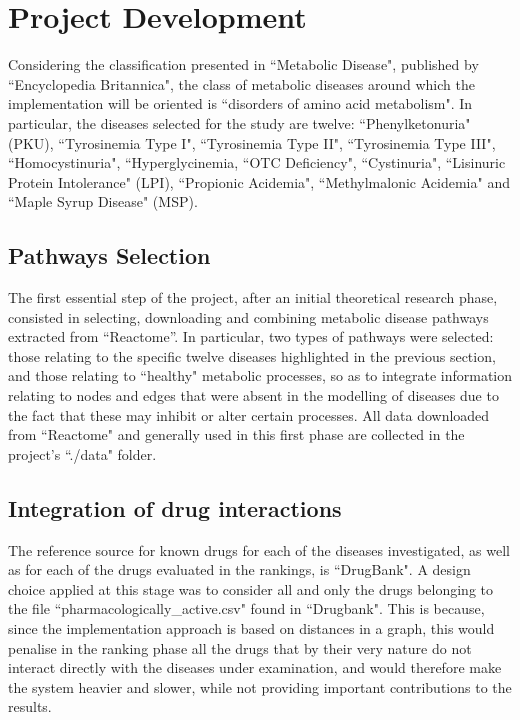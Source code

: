 \chapter{Project Development}\label{chap:project}

Considering the classification presented in ``Metabolic Disease", published by ``Encyclopedia Britannica"\cite{britannica}, the class of metabolic diseases around which the implementation will be oriented is ``disorders of amino acid metabolism". In particular, the diseases selected for the study are twelve: ``Phenylketonuria" (PKU), ``Tyrosinemia Type I", ``Tyrosinemia Type II", ``Tyrosinemia Type III", ``Homocystinuria", ``Hyperglycinemia, ``OTC Deficiency", ``Cystinuria", ``Lisinuric Protein Intolerance" (LPI), ``Propionic Acidemia", ``Methylmalonic Acidemia" and ``Maple Syrup Disease" (MSP).

\section{Pathways Selection}

The first essential step of the project, after an initial theoretical research phase, consisted in selecting, downloading and combining metabolic disease pathways extracted from ``Reactome''\cite{reactome}. In particular, two types of pathways were selected: those relating to the specific twelve diseases highlighted in the previous section, and those relating to ``healthy" metabolic processes, so as to integrate information relating to nodes and edges that were absent in the modelling of diseases due to the fact that these may inhibit or alter certain processes. All data downloaded from ``Reactome"\cite{reactome} and generally used in this first phase are collected in the project's ``./data" folder.

\section{Integration of drug interactions}
The reference source for known drugs for each of the diseases investigated, as well as for each of the drugs evaluated in the rankings, is ``DrugBank"\cite{drugbank}.
A design choice applied at this stage was to consider all and only the drugs belonging to the file ``pharmacologically\_active.csv" found in ``Drugbank"\cite{drugbank}. This is because, since the implementation approach is based on distances in a graph, this would penalise in the ranking phase all the drugs that by their very nature do not interact directly with the diseases under examination, and would therefore make the system heavier and slower, while not providing important contributions to the results.

